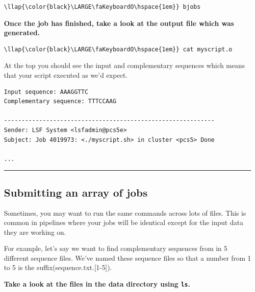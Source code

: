 \documentclass[11pt]{article}
\begin{document}
\begin{terminalinput}
\begin{Verbatim}[commandchars=\\\{\}]
\llap{\color{black}\LARGE\faKeyboardO\hspace{1em}} bjobs
\end{Verbatim}
\end{terminalinput}


    \textbf{Once the job has finished, take a look at the output file which
was generated.}

\begin{terminalinput}
\begin{Verbatim}[commandchars=\\\{\}]
\llap{\color{black}\LARGE\faKeyboardO\hspace{1em}} cat myscript.o
\end{Verbatim}
\end{terminalinput}


    At the top you should see the input and complementary sequences which
means that your script executed as we'd expect.

    \begin{verbatim}
Input sequence: AAAGGTTC
Complementary sequence: TTTCCAAG

------------------------------------------------------------
Sender: LSF System <lsfadmin@pcs5e>
Subject: Job 4019973: <./myscript.sh> in cluster <pcs5> Done

...
\end{verbatim}

    \begin{center}\rule{0.5\linewidth}{\linethickness}\end{center}

    \subsection{Submitting an array of
jobs}\label{submitting-an-array-of-jobs}

    Sometimes, you may want to run the same commands across lots of files.
This is common in pipelines where your jobs will be identical except for
the input data they are working on.

For example, let's say we want to find complementary sequences from in 5
different sequence files. We've named these sequence files so that a
number from 1 to 5 is the suffix(sequence.txt.{[}1-5{]}).

\textbf{Take a look at the files in the data directory using
\texttt{ls}.}
\end{document}
